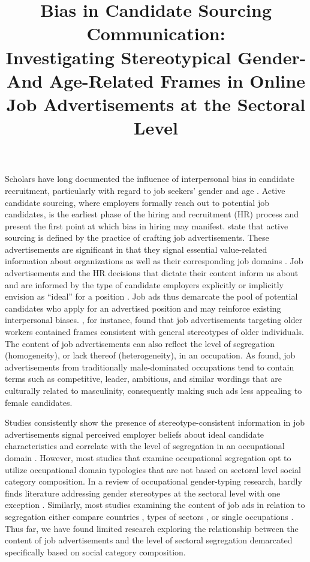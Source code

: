 \documentclass[jou]{apa7}
\title{Bias in Candidate Sourcing Communication:\\
Investigating Stereotypical Gender- And Age-Related Frames in Online Job Advertisements at the Sectoral Level}
\begin{document}
\maketitle

Scholars have long documented the influence of interpersonal bias in candidate recruitment, particularly with regard to job seekers’ gender and age \parencite{beattiePossibleUnconsciousBias2012,heilmanPresumedIncompetentPerceived2015,paleariWhenPrejudiceYou2019}. Active candidate sourcing, where employers formally reach out to potential job candidates, is the earliest phase of the hiring and recruitment (HR) process and present the first point at which bias in hiring may manifest. \textcite{RynesS.1989} state that active sourcing is defined by the practice of crafting job advertisements. These advertisements are significant in that they signal essential value-related information about organizations as well as their corresponding job domains \parencite{decoomanPortrayingFittingValues2012}. Job advertisements and the HR decisions that dictate their content inform us about and are informed by the type of candidate employers explicitly or implicitly envision as “ideal” for a position \parencite{kellyGenderedChallengeGendered2010}. Job ads thus demarcate the pool of potential candidates who apply for an advertised position and may reinforce existing interpersonal biases. \textcite{vanselmSearchOlderWorker2021}, for instance, found that job advertisements targeting older workers contained frames consistent with general stereotypes of older individuals. The content of job advertisements can also reflect the level of segregation (homogeneity), or lack thereof (heterogeneity), in an occupation. As \textcite{Gaucher2011} found, job advertisements from traditionally male-dominated occupations tend to contain terms such as competitive, leader, ambitious, and similar wordings that are culturally related to masculinity, consequently making such ads less appealing to female candidates.

Studies consistently show the presence of stereotype-consistent information in job advertisements signal perceived employer beliefs about ideal candidate characteristics and correlate with the level of segregation in an occupational domain \parencite{Hodel2017,walkerRecruitmentRoleJob2014}. However, most studies that examine occupational segregation opt to utilize occupational domain typologies that are not based on sectoral level social category composition. In a review of occupational gender-typing research, \textcite{clarkeGenderStereotypesGenderTyped2020} hardly finds literature addressing gender stereotypes at the sectoral level with one exception \parencite[i.e.,][]{garcia-retameroPrejudiceWomenMalecongenial2006}. Similarly, most studies examining the content of job ads in relation to segregation either compare countries \parencite{Hodel2017,jannariGenderingExpertWork2018}, types of sectors \parencite[e.g., public vs. private sectors;][]{decoomanPortrayingFittingValues2012}, or single occupations \parencite{linosMorePublicService2018}. Thus far, we have found limited research exploring the relationship between the content of job advertisements and the level of sectoral segregation demarcated specifically based on social category composition.
\end{document}
